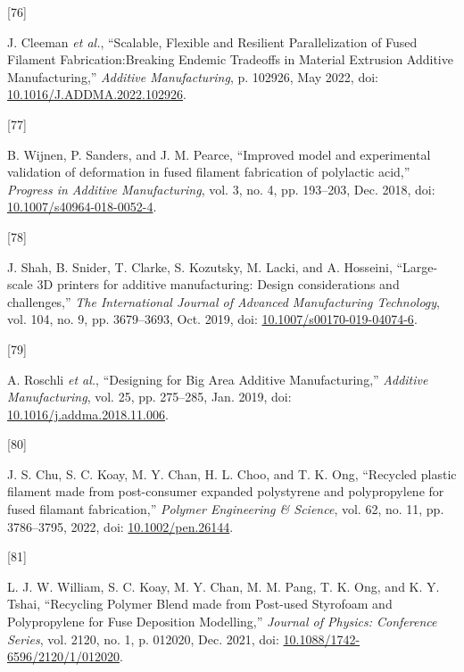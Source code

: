 \documentclass[
]{article}
\newlength{\cslhangindent}
\newlength{\csllabelwidth}
\newlength{\cslentryspacingunit} %
\newenvironment{CSLReferences}[2] %
 {%
  \setlength{\parindent}{0pt}
  \ifodd #1
  \let\oldpar\par
  \def\par{\hangindent=\cslhangindent\oldpar}
  \fi
  \setlength{\parskip}{#2\cslentryspacingunit}
 }%
 {}
\newcommand{\CSLLeftMargin}[1]{\parbox[t]{\csllabelwidth}{#1}}
\newcommand{\CSLRightInline}[1]{\parbox[t]{\linewidth - \csllabelwidth}{#1}\break}
\begin{document}
\begin{CSLReferences}{0}{0}
\leavevmode{}%
\CSLLeftMargin{{[}76{]} }%
\CSLRightInline{J. Cleeman \emph{et al.}, {``Scalable, {Flexible} and
{Resilient Parallelization} of {Fused Filament Fabrication}:{Breaking
Endemic Tradeoffs} in {Material Extrusion Additive Manufacturing},''}
\emph{Additive Manufacturing}, p. 102926, May 2022, doi:
\href{https://doi.org/10.1016/J.ADDMA.2022.102926}{10.1016/J.ADDMA.2022.102926}.}

\leavevmode{}%
\CSLLeftMargin{{[}77{]} }%
\CSLRightInline{B. Wijnen, P. Sanders, and J. M. Pearce, {``Improved
model and experimental validation of deformation in fused filament
fabrication of polylactic acid,''} \emph{Progress in Additive
Manufacturing}, vol. 3, no. 4, pp. 193--203, Dec. 2018, doi:
\href{https://doi.org/10.1007/s40964-018-0052-4}{10.1007/s40964-018-0052-4}.}

\leavevmode{}%
\CSLLeftMargin{{[}78{]} }%
\CSLRightInline{J. Shah, B. Snider, T. Clarke, S. Kozutsky, M. Lacki,
and A. Hosseini, {``Large-scale {3D} printers for additive
manufacturing: Design considerations and challenges,''} \emph{The
International Journal of Advanced Manufacturing Technology}, vol. 104,
no. 9, pp. 3679--3693, Oct. 2019, doi:
\href{https://doi.org/10.1007/s00170-019-04074-6}{10.1007/s00170-019-04074-6}.}

\leavevmode{}%
\CSLLeftMargin{{[}79{]} }%
\CSLRightInline{A. Roschli \emph{et al.}, {``Designing for {Big Area
Additive Manufacturing},''} \emph{Additive Manufacturing}, vol. 25, pp.
275--285, Jan. 2019, doi:
\href{https://doi.org/10.1016/j.addma.2018.11.006}{10.1016/j.addma.2018.11.006}.}

\leavevmode{}%
\CSLLeftMargin{{[}80{]} }%
\CSLRightInline{J. S. Chu, S. C. Koay, M. Y. Chan, H. L. Choo, and T. K.
Ong, {``Recycled plastic filament made from post-consumer expanded
polystyrene and polypropylene for fused filamant fabrication,''}
\emph{Polymer Engineering \& Science}, vol. 62, no. 11, pp. 3786--3795,
2022, doi: \href{https://doi.org/10.1002/pen.26144}{10.1002/pen.26144}.}

\leavevmode{}%
\CSLLeftMargin{{[}81{]} }%
\CSLRightInline{L. J. W. William, S. C. Koay, M. Y. Chan, M. M. Pang, T.
K. Ong, and K. Y. Tshai, {``Recycling {Polymer Blend} made from
{Post-used Styrofoam} and {Polypropylene} for {Fuse Deposition
Modelling},''} \emph{Journal of Physics: Conference Series}, vol. 2120,
no. 1, p. 012020, Dec. 2021, doi:
\href{https://doi.org/10.1088/1742-6596/2120/1/012020}{10.1088/1742-6596/2120/1/012020}.}


\end{CSLReferences}
\end{document}
